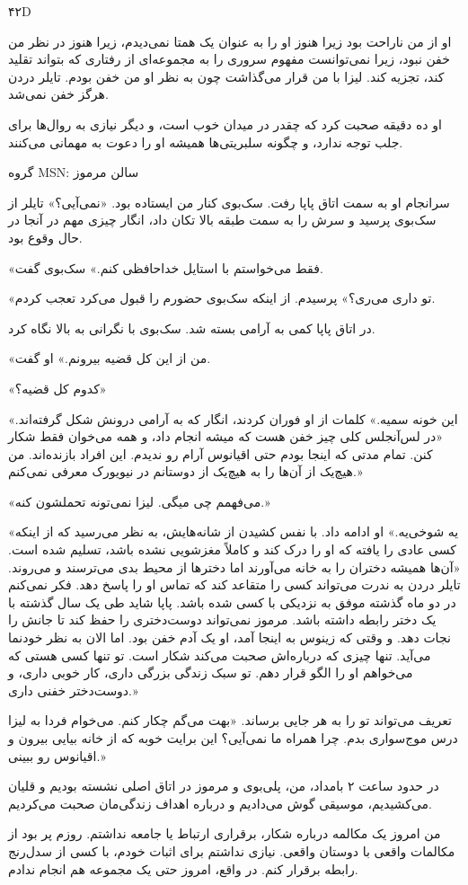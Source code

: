 ۴۲D

او از من ناراحت بود زیرا هنوز او را به عنوان یک همتا نمی‌دیدم، زیرا هنوز در نظر من خفن نبود، زیرا نمی‌توانست مفهوم سروری را به مجموعه‌ای از رفتاری که بتواند تقلید کند، تجزیه کند. لیزا با من قرار می‌گذاشت چون به نظر او من خفن بودم. تایلر دردن هرگز خفن نمی‌شد.

او ده دقیقه صحبت کرد که چقدر در میدان خوب است، و دیگر نیازی به روال‌ها برای جلب توجه ندارد، و چگونه سلبریتی‌ها همیشه او را دعوت به مهمانی می‌کنند.

گروه MSN: سالن مرموز

سرانجام او به سمت اتاق پاپا رفت. سک‌بوی کنار من ایستاده بود. «نمی‌آیی؟» تایلر از سک‌بوی پرسید و سرش را به سمت طبقه بالا تکان داد، انگار چیزی مهم در آنجا در حال وقوع بود.

«فقط می‌خواستم با استایل خداحافظی کنم.» سک‌بوی گفت.

«تو داری می‌ری؟» پرسیدم. از اینکه سک‌بوی حضورم را قبول می‌کرد تعجب کردم.

در اتاق پاپا کمی به آرامی بسته شد. سک‌بوی با نگرانی به بالا نگاه کرد.

«من از این کل قضیه بیرونم.» او گفت.

«کدوم کل قضیه؟»

«این خونه سمیه.» کلمات از او فوران کردند، انگار که به آرامی درونش شکل گرفته‌اند. «در لس‌آنجلس کلی چیز خفن هست که میشه انجام داد، و همه می‌خوان فقط شکار کنن. تمام مدتی که اینجا بودم حتی اقیانوس آرام رو ندیدم. این افراد بازنده‌اند. من هیچ‌یک از آن‌ها را به هیچ‌یک از دوستانم در نیویورک معرفی نمی‌کنم.»

«می‌فهمم چی میگی. لیزا نمی‌تونه تحملشون کنه.»

«یه شوخی‌یه.» او ادامه داد. با نفس کشیدن از شانه‌هایش، به نظر می‌رسید که از اینکه کسی عادی را یافته که او را درک کند و کاملاً مغزشویی نشده باشد، تسلیم شده است. «آن‌ها همیشه دختران را به خانه می‌آورند اما دخترها از محیط بدی می‌ترسند و می‌روند. تایلر دردن به ندرت می‌تواند کسی را متقاعد کند که تماس او را پاسخ دهد. فکر نمی‌کنم در دو ماه گذشته موفق به نزدیکی با کسی شده باشد. پاپا شاید طی یک سال گذشته با یک دختر رابطه داشته باشد. مرموز نمی‌تواند دوست‌دختری را حفظ کند تا جانش را نجات دهد. و وقتی که زینوس به اینجا آمد، او یک آدم خفن بود. اما الان به نظر خودنما می‌آید. تنها چیزی که درباره‌اش صحبت می‌کند شکار است. تو تنها کسی هستی که می‌خواهم او را الگو قرار دهم. تو سبک زندگی بزرگی داری، کار خوبی داری، و دوست‌دختر خفنی داری.»

تعریف می‌تواند تو را به هر جایی برساند. «بهت می‌گم چکار کنم. می‌خوام فردا به لیزا درس موج‌سواری بدم. چرا همراه ما نمی‌آیی؟ این برایت خوبه که از خانه بیایی بیرون و اقیانوس رو ببینی.»

در حدود ساعت ۲ بامداد، من، پلی‌بوی و مرموز در اتاق اصلی نشسته بودیم و قلیان می‌کشیدیم، موسیقی گوش می‌دادیم و درباره اهداف زندگی‌مان صحبت می‌کردیم.

من امروز یک مکالمه درباره شکار، برقراری ارتباط یا جامعه نداشتم. روزم پر بود از مکالمات واقعی با دوستان واقعی. نیازی نداشتم برای اثبات خودم، با کسی از سدل‌رنج رابطه برقرار کنم. در واقع، امروز حتی یک مجموعه هم انجام ندادم.